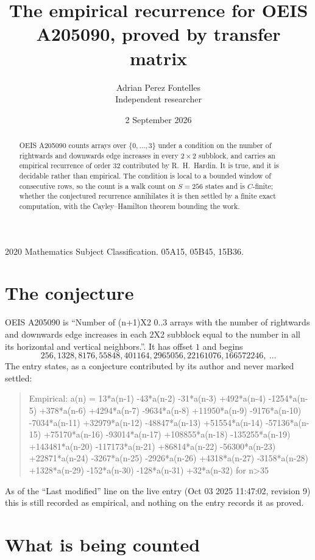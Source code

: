 \documentclass[11pt,a4paper]{article}
\title{The empirical recurrence for OEIS A205090, proved by transfer matrix}
\author{Adrian Perez Fontelles\\ \small Independent researcher}
\date{2 September 2026}
\theoremstyle{plain}
\theoremstyle{definition}
\begin{document}
\maketitle

\begin{abstract}
OEIS A205090 counts arrays over $\{0,\dots,3\}$ under a condition on the number of rightwards and downwards edge increases
in every $2\times2$ subblock, and carries an empirical recurrence of order $32$ contributed by
R.~H.~Hardin. It is true, and it is decidable rather than empirical. The condition is local to
a bounded window of consecutive rows, so the count is a walk count on $S=256$ states and is
$C$-finite; whether the conjectured recurrence annihilates it is then settled by a finite exact
computation, with the Cayley--Hamilton theorem bounding the work.
\end{abstract}

\noindent\small 2020 Mathematics Subject Classification. 05A15, 05B45, 15B36.\normalsize

\section{The conjecture}

OEIS A205090 is ``Number of (n+1)X2 0..3 arrays with the number of rightwards and downwards edge increases in each 2X2 subblock equal to the number in all its horizontal and vertical neighbors.''. It has offset $1$ and begins
\[
256, 1328, 8176, 55848, 401164, 2965056, 22161076, 166572246,\ \dots
\]
The entry states, as a conjecture contributed by its author and never marked settled:
\begin{quote}
Empirical: a(n) = 13*a(n-1) -43*a(n-2) -31*a(n-3) +492*a(n-4) -1254*a(n-5) +378*a(n-6) +4294*a(n-7) -9634*a(n-8) +11950*a(n-9) -9176*a(n-10) -7034*a(n-11) +32979*a(n-12) -48847*a(n-13) +51554*a(n-14) -57136*a(n-15) +75170*a(n-16) -93014*a(n-17) +108855*a(n-18) -135255*a(n-19) +143481*a(n-20) -117173*a(n-21) +86814*a(n-22) -56300*a(n-23) +22871*a(n-24) -3267*a(n-25) -2926*a(n-26) +4318*a(n-27) -3158*a(n-28) +1328*a(n-29) -152*a(n-30) -128*a(n-31) +32*a(n-32) for n>35
\end{quote}
As of the ``Last modified'' line on the live entry (Oct 03 2025 11:47:02, revision 9) this is still
recorded as empirical, and nothing on the entry records it as proved.

\section{What is being counted}
\end{document}
